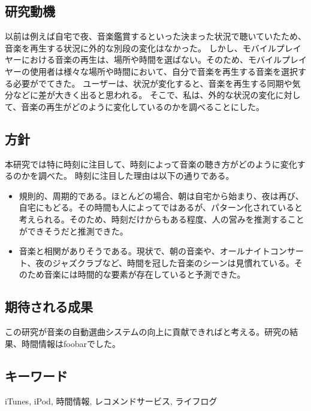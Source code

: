 \documentclass{jsarticle}
\begin{document}
\subsection{研究動機}

以前は例えば自宅で夜、音楽鑑賞するといった決まった状況で聴いていたため、音楽を再生する状況に外的な別段の変化はなかった。
しかし、モバイルプレイヤーにおける音楽の再生は、場所や時間を選ばない。そのため、モバイルプレイヤーの使用者は様々な場所や時間において、自分で音楽を再生する音楽を選択する必要がでてきた。
ユーザーは、状況が変化すると、音楽を再生する同期や気分などに差が大きく出ると思われる。
そこで、私は、外的な状況の変化に対して、音楽の再生がどのように変化しているのかを調べることにした。
\subsection{方針}
本研究では特に時刻に注目して、時刻によって音楽の聴き方がどのように変化するのかを調べた。
時刻に注目した理由は以下の通りである。
\begin{itemize}
\item
規則的、周期的である。ほとんどの場合、朝は自宅から始まり、夜は再び、自宅にもどる。その時間も人によってではあるが、パターン化されていると考えられる。そのため、時刻だけからもある程度、人の営みを推測することができそうだと推測できた。
\item
音楽と相関がありそうである。現状で、朝の音楽や、オールナイトコンサート、夜のジャズクラブなど、時間を冠した音楽のシーンは見慣れている。そのため音楽には時間的な要素が存在していると予測できた。
\end{itemize}

\subsection{期待される成果}
この研究が音楽の自動選曲システムの向上に貢献できればと考える。研究の結果、時間情報はfoobarでした。
\subsection{キーワード}
iTunes, iPod, 時間情報, レコメンドサービス, ライフログ
\end{document}
